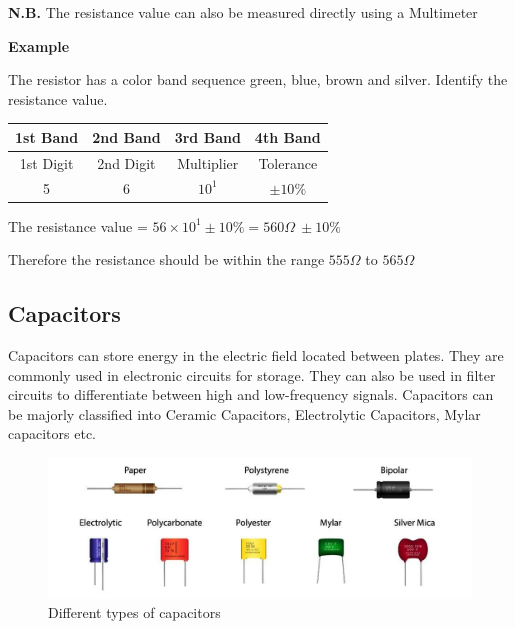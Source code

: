 \noindent \textbf{N.B.} The resistance value can also be measured directly using a Multimeter

\vspace{1 cm}
\noindent \textbf{Example} 

\noindent The resistor has a color band sequence green, blue, brown and silver. Identify the resistance value.


\begin{figure}[H]
    \centering
    
    \label{fig:example}
\end{figure}

\begin{table}[H]
    \centering
    \begin{tabular}{c|c|c|c}
    \hline
        1st Band &  2nd Band & 3rd Band & 4th Band\\
    \hline \hline    
        1st Digit & 2nd Digit & Multiplier & Tolerance \\
        5 & 6 & $10^1$ & $\pm 10\%$ \\
    \hline 
    \end{tabular}

    \label{tab:my_label}
\end{table}

\noindent The resistance value = $56 \times 10^1 \pm 10\% = 560 \Omega \ \pm 10\%$ 

\noindent Therefore the resistance should be within the range $555 \Omega$ to $565 \Omega$

\subsection*{Capacitors}

Capacitors can store energy in the electric field located between plates. They are commonly used in electronic circuits for storage. They can also be used in filter circuits to differentiate between high and low-frequency signals. Capacitors can be majorly classified into Ceramic Capacitors, Electrolytic Capacitors, Mylar capacitors etc.

\begin{figure}[H]
    \centering
    \includegraphics[width=0.9\linewidth]{img/capacitor.png}
    \caption{Different types of capacitors}
    \label{fig:enter-label}
\end{figure}


